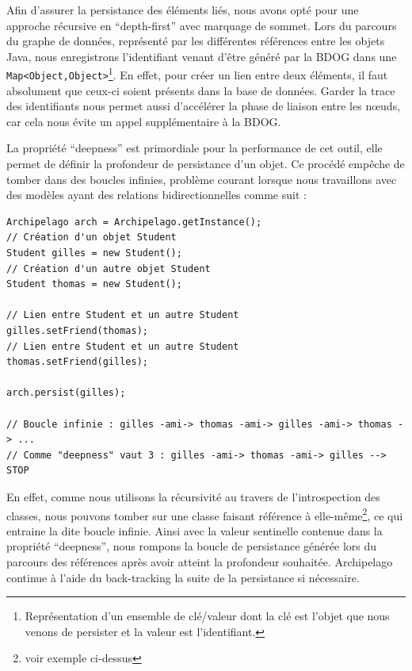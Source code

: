 \documentclass[a4paper,fleqn,12pt,oneside]{book}
\begin{document}
Afin d'assurer la persistance des éléments liés, nous avons opté pour une approche récursive en \enquote{depth-first} avec marquage de sommet. Lors du parcours du graphe de données, représenté par les différentes références entre les objets Java, nous enregistrons l'identifiant venant d'être généré par la BDOG dans une \texttt{Map<Object,Object>}\footnote{Représentation d'un ensemble de clé/valeur dont la clé est l'objet que nous venons de persister et la valeur est  l'identifiant.}. En effet, pour créer un lien entre deux éléments, il faut absolument que ceux-ci soient présents dans la base de données. Garder la trace des identifiants nous permet aussi d'accélérer la phase de liaison entre les nœuds, car cela nous évite un appel supplémentaire à la BDOG.

La propriété \enquote{deepness} est primordiale pour la performance de cet outil, elle permet de définir la profondeur de persistance d'un objet. Ce procédé empêche de tomber dans des boucles infinies, problème courant lorsque nous travaillons avec des modèles ayant des relations bidirectionnelles comme suit : 

\begin{lstlisting}
Archipelago arch = Archipelago.getInstance();
// Création d'un objet Student
Student gilles = new Student();
// Création d'un autre objet Student
Student thomas = new Student();

// Lien entre Student et un autre Student
gilles.setFriend(thomas);
// Lien entre Student et un autre Student
thomas.setFriend(gilles);

arch.persist(gilles);

// Boucle infinie : gilles -ami-> thomas -ami-> gilles -ami-> thomas -> ...
// Comme "deepness" vaut 3 : gilles -ami-> thomas -ami-> gilles --> STOP
\end{lstlisting}

En effet, comme nous utilisons la récursivité au travers de l'introspection des classes, nous pouvons tomber sur une classe faisant référence à elle-même\footnote{voir exemple ci-dessus}, ce qui entraine la dite boucle infinie. Ainsi avec la valeur sentinelle contenue dans la propriété \enquote{deepness}, nous rompons la boucle de persistance générée lors du parcours des références après avoir atteint la profondeur souhaitée. Archipelago continue à l'aide du back-tracking la suite de la persistance si nécessaire.
\end{document}
